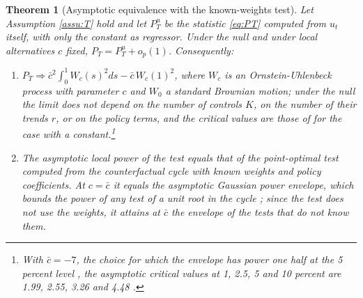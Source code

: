 \documentclass[12pt,a4paper]{article}
\newtheorem{thm}{Theorem}
\theoremstyle{definition}
\theoremstyle{definition}\newtheorem{example}{Example}
\theoremstyle{definition}\newtheorem{definition}{Definition}
\begin{document}
\begin{thm}[Asymptotic equivalence with the known-weights test\label{thm:po}]
Let Assumption \ref{assu:T} hold and let $P^u_T$ be the statistic \eqref{eq:PT} computed from $u_t$ itself, with only the constant as regressor. Under the null and under local alternatives $c$ fixed, $P_T=P^u_T+o_p(1)$. Consequently:
\begin{enumerate}
\item[(a)] $P_T\Rightarrow\bar c^2\int_0^1W_c(s)^2ds-\bar c\,W_c(1)^2$, where $W_c$ is an Ornstein-Uhlenbeck process with parameter $c$ and $W_0$ a standard Brownian motion; under the null the limit does not depend on the number of controls $K$, on the number of their trends $r$, or on the policy terms, and the critical values are those of \citet{ERS1996} for the case with a constant.\footnote{With $\bar c=-7$, the choice for which the envelope has power one half at the 5 percent level \citep[p.~821]{ERS1996}, the asymptotic critical values at 1, 2.5, 5 and 10 percent are 1.99, 2.55, 3.26 and 4.48 \citep[Table I]{ERS1996}.}
\item[(b)] The asymptotic local power of the test equals that of the point-optimal test computed from the counterfactual cycle with known weights and policy coefficients. At $c=\bar c$ it equals the asymptotic Gaussian power envelope, which bounds the power of any test of a unit root in the cycle \citep{ERS1996}; since the test does not use the weights, it attains at $\bar c$ the envelope of the tests that do not know them.
\end{enumerate}
\end{thm}
\end{document}
